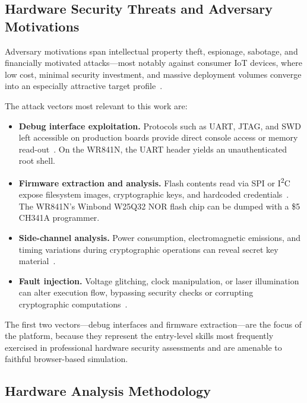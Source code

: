 \subsection{Hardware Security Threats and Adversary Motivations}\label{subsec:hw-threats}

Adversary motivations span intellectual property theft, espionage, sabotage, and financially motivated attacks---most notably against consumer IoT devices, where low cost, minimal security investment, and massive deployment volumes converge into an especially attractive target profile~\cite{becker2013stealthy, antonakakis2017mirai}.

The attack vectors most relevant to this work are:
\begin{itemize}
    \item \textbf{Debug interface exploitation.} Protocols such as UART, JTAG, and SWD left accessible on production boards provide direct console access or memory read-out~\cite{shwartz2017}. On the WR841N, the UART header yields an unauthenticated root shell.
    \item \textbf{Firmware extraction and analysis.} Flash contents read via SPI or I\textsuperscript{2}C expose filesystem images, cryptographic keys, and hardcoded credentials~\cite{costin2014large}. The WR841N's Winbond W25Q32 NOR flash chip can be dumped with a \$5 CH341A programmer.
    \item \textbf{Side-channel analysis.} Power consumption, electromagnetic emissions, and timing variations during cryptographic operations can reveal secret key material~\cite{kocher1999dpa}.
    \item \textbf{Fault injection.} Voltage glitching, clock manipulation, or laser illumination can alter execution flow, bypassing security checks or corrupting cryptographic computations~\cite{barenghi2012fault}.
\end{itemize}

The first two vectors---debug interfaces and firmware extraction---are the focus of the \pcbctf{} platform, because they represent the entry-level skills most frequently exercised in professional hardware security assessments and are amenable to faithful browser-based simulation.

\subsection{Hardware Analysis Methodology}\label{subsec:hw-compromise}\label{subsec:methodology}

